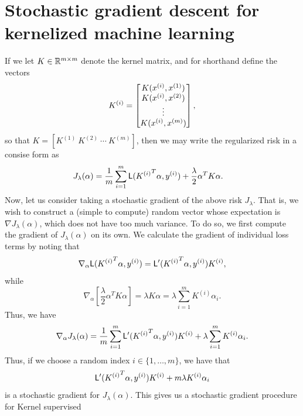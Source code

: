 \documentclass{article}
\newcommand{\loss}{\mathsf{L}}
\begin{document}
\section{Stochastic gradient descent for kernelized machine learning}
\newcommand{\Ksi}{{K^{(i)}}}

If we let $K \in \mathbb{R}^{m \times m}$ denote the kernel matrix, and for shorthand
define the vectors
\begin{equation*}
  \Ksi = \left[\begin{matrix} K(\xsi, x^{(1)}) \\ K(\xsi, x^{(2)}) \\
      \vdots \\ K(\xsi, x^{(m)})\end{matrix}\right],
\end{equation*}
so that $K = [K^{(1)} ~ K^{(2)} ~ \cdots ~ K^{(m)}]$, then we may write
the regularized risk in a consise form as
\begin{align*}
  J_\lambda(\alpha)
  & = \frac{1}{m} \sum_{i = 1}^m \loss(\Ksi^T \alpha, \ysi)
  + \frac{\lambda}{2} \alpha^T K \alpha.
\end{align*}
Now, let us consider taking a stochastic gradient of the above risk
$J_\lambda$. That is, we wish to construct a (simple to compute) random
vector whose expectation is $\nabla J_\lambda(\alpha)$, which does not have
too much variance. 
To do so, we first compute the gradient of $J_\lambda(\alpha)$ on its own.
We calculate the gradient of individual loss terms by noting that
\begin{equation*}
  \nabla_\alpha \loss(\Ksi^T \alpha, \ysi)
  = \loss'(\Ksi^T \alpha, \ysi) \Ksi,
\end{equation*}
while
\begin{equation*}
  \nabla_\alpha \left[\frac{\lambda}{2} \alpha^T K\alpha
    \right]
  = \lambda K\alpha = \lambda \sum_{i = 1}^m \Ksi \alpha_i.
\end{equation*}
Thus, we have
\begin{equation*}
  \nabla_\alpha J_\lambda(\alpha)
  = \frac{1}{m} \sum_{i=1}^m \loss'(\Ksi^T\alpha, \ysi) \Ksi
  + \lambda \sum_{i=1}^m \Ksi \alpha_i.
\end{equation*}
Thus, if we choose a random index $i \in \{1, \ldots, m\}$, we have that
\begin{equation*}
  \loss'(\Ksi^T \alpha, \ysi) \Ksi + m \lambda \Ksi \alpha_i
\end{equation*}
is a stochastic gradient for $J_\lambda(\alpha)$.
This gives us a stochastic gradient procedure for Kernel supervised
\end{document}
